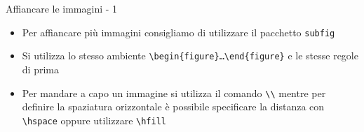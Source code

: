 \begin{frame}{Affiancare le immagini - 1}

\begin{itemize}
	\item Per affiancare più immagini consigliamo di utilizzare il pacchetto 
	\texttt{subfig}
	\item Si utilizza lo stesso ambiente 
	\texttt{\textbackslash{}begin\{figure\}\dots{}\textbackslash{}end\{figure\}}
	e le stesse regole di prima
	\item Per mandare a capo un immagine si utilizza il comando 
	\texttt{\textbackslash{}\textbackslash{}} mentre per definire la spaziatura 
	orizzontale è possibile specificare la distanza con 
	\texttt{\textbackslash{}hspace} oppure utilizzare 
	\texttt{\textbackslash{}hfill}
\end{itemize}

\end{frame}